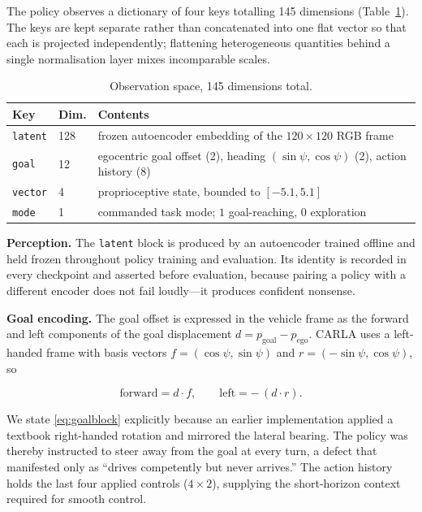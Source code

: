 The policy observes a dictionary of four keys totalling 145 dimensions
(Table~\ref{tab:obs}). The keys are kept separate rather than concatenated into
one flat vector so that each is projected independently; flattening
heterogeneous quantities behind a single normalisation layer mixes incomparable
scales.

\begin{table}[t]
\centering
\caption{Observation space, \num{145} dimensions total.}
\label{tab:obs}
\begin{tabular}{@{}llp{4.6cm}@{}}
\toprule
Key & Dim. & Contents \\
\midrule
\texttt{latent} & 128 & frozen autoencoder embedding of the
                        $120\!\times\!120$ RGB frame \\
\texttt{goal}   & 12  & egocentric goal offset (2), heading
                        $(\sin\psi, \cos\psi)$ (2), action history (8) \\
\texttt{vector} & 4   & proprioceptive state, bounded to $[-5.1, 5.1]$ \\
\texttt{mode}   & 1   & commanded task mode; $1$ goal-reaching, $0$ exploration \\
\bottomrule
\end{tabular}
\end{table}

\textbf{Perception.} The \texttt{latent} block is produced by an autoencoder
trained offline and held frozen throughout policy training and evaluation. Its
identity is recorded in every checkpoint and asserted before evaluation, because
pairing a policy with a different encoder does not fail loudly---it produces
confident nonsense.

\textbf{Goal encoding.} The goal offset is expressed in the vehicle frame as the
forward and left components of the goal displacement
$d = p_{\mathrm{goal}} - p_{\mathrm{ego}}$. CARLA uses a left-handed frame with
basis vectors $f = (\cos\psi, \sin\psi)$ and $r = (-\sin\psi, \cos\psi)$, so

\begin{equation}
\label{eq:goalblock}
  \mathrm{forward} = d \cdot f,
  \qquad
  \mathrm{left} = -\,(d \cdot r).
\end{equation}

We state \eqref{eq:goalblock} explicitly because an earlier implementation
applied a textbook right-handed rotation and mirrored the lateral bearing. The
policy was thereby instructed to steer away from the goal at every turn, a
defect that manifested only as ``drives competently but never arrives.'' The
action history holds the last four applied controls ($4\!\times\!2$), supplying
the short-horizon context required for smooth control.

